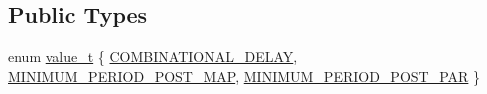 \subsection*{Public Types}
\begin{DoxyCompactItemize}
\item 
enum \hyperlink{classLUT__model_a863cc03b53b14df7344ada5a1bed2b20}{value\+\_\+t} \{ \hyperlink{classLUT__model_a863cc03b53b14df7344ada5a1bed2b20adff8f76601321d4c8e7694b58ddc14a2}{C\+O\+M\+B\+I\+N\+A\+T\+I\+O\+N\+A\+L\+\_\+\+D\+E\+L\+AY}, 
\hyperlink{classLUT__model_a863cc03b53b14df7344ada5a1bed2b20a2890fc8543e130918789dd289ab2597d}{M\+I\+N\+I\+M\+U\+M\+\_\+\+P\+E\+R\+I\+O\+D\+\_\+\+P\+O\+S\+T\+\_\+\+M\+AP}, 
\hyperlink{classLUT__model_a863cc03b53b14df7344ada5a1bed2b20a3c1732bfbde8cd05618ff6aa71c72327}{M\+I\+N\+I\+M\+U\+M\+\_\+\+P\+E\+R\+I\+O\+D\+\_\+\+P\+O\+S\+T\+\_\+\+P\+AR}
 \}
\end{DoxyCompactItemize}
